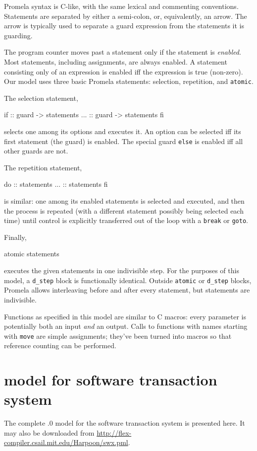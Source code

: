 Promela syntax is C-like, with the same lexical and commenting
conventions.  Statements are separated by either a semi-colon, or,
equivalently, an arrow.  The arrow is typically used to separate a
guard expression from the statements it is guarding.

The program counter moves past a statement only if the statement is
{\it enabled}.  Most
statements, including assignments, are always enabled.
A statement consisting only of an expression is enabled iff the
expression is true (non-zero).
Our model uses three basic Promela statements: selection, repetition,
and {\tt atomic}.

The selection statement,
\begin{inlinecode}
if
:: guard -> statements
...
:: guard -> statements
fi
\end{inlinecode}
selects one among its options and executes it.  An option can be
selected iff its first statement (the guard) is enabled.  The
special guard {\tt else} is enabled iff all other guards are not.

The repetition statement,
\begin{inlinecode}
do
:: statements
...
:: statements
fi
\end{inlinecode}
is similar: one among its enabled statements is selected and executed,
and then the process is repeated (with a different statement possibly
being selected each time) until control is explicitly transferred out
of the loop with a {\tt break} or {\tt goto}.

Finally,
\begin{inlinecode}
atomic { statements }
\end{inlinecode}
executes the given statements in one indivisible step.  For the
purposes of this model, a {\tt d\_step} block is functionally identical.
Outside {\tt atomic} or {\tt d\_step} blocks, Promela allows
interleaving before and after every statement, but statements are
indivisible.

Functions as specified in this model are similar to C macros: every
parameter is potentially both an input {\it and} an output.  Calls to
functions with names starting with {\tt move} are simple assignments;
they've been turned into macros so that reference counting
can be performed.

\section{\Spin model for software transaction system}
The complete .0 model for the \flex software transaction system is
presented here.  It may also be downloaded from
\url{http://flex-compiler.csail.mit.edu/Harpoon/swx.pml}.

{\linespread{0.9}\footnotesize}

